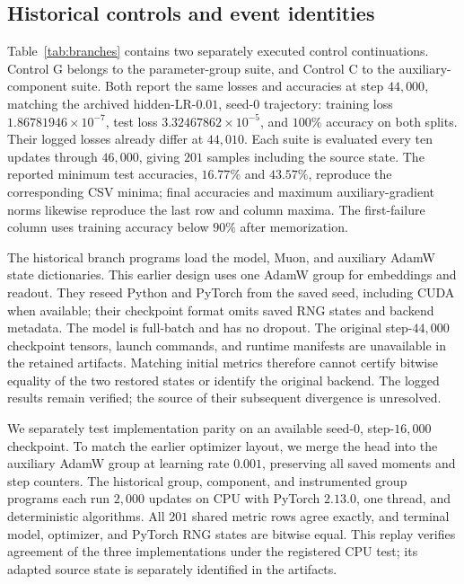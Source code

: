 \subsection{Historical controls and event identities}
\label{app:control-provenance}

Table~\ref{tab:branches} contains two separately executed control continuations. Control G belongs to the parameter-group suite, and Control C to the auxiliary-component suite. Both report the same losses and accuracies at step $44{,}000$, matching the archived hidden-LR-$0.01$, seed-$0$ trajectory: training loss $1.86781946\times10^{-7}$, test loss $3.32467862\times10^{-5}$, and $100\%$ accuracy on both splits. Their logged losses already differ at $44{,}010$. Each suite is evaluated every ten updates through $46{,}000$, giving $201$ samples including the source state. The reported minimum test accuracies, $16.77\%$ and $43.57\%$, reproduce the corresponding CSV minima; final accuracies and maximum auxiliary-gradient norms likewise reproduce the last row and column maxima. The first-failure column uses training accuracy below $90\%$ after memorization.

The historical branch programs load the model, Muon, and auxiliary AdamW state dictionaries. This earlier design uses one AdamW group for embeddings and readout. They reseed Python and PyTorch from the saved seed, including CUDA when available; their checkpoint format omits saved RNG states and backend metadata. The model is full-batch and has no dropout. The original step-$44{,}000$ checkpoint tensors, launch commands, and runtime manifests are unavailable in the retained artifacts. Matching initial metrics therefore cannot certify bitwise equality of the two restored states or identify the original backend. The logged results remain verified; the source of their subsequent divergence is unresolved.

We separately test implementation parity on an available seed-$0$, step-$16{,}000$ checkpoint. To match the earlier optimizer layout, we merge the head into the auxiliary AdamW group at learning rate $0.001$, preserving all saved moments and step counters. The historical group, component, and instrumented group programs each run $2{,}000$ updates on CPU with PyTorch $2.13.0$, one thread, and deterministic algorithms. All $201$ shared metric rows agree exactly, and terminal model, optimizer, and PyTorch RNG states are bitwise equal. This replay verifies agreement of the three implementations under the registered CPU test; its adapted source state is separately identified in the artifacts.

